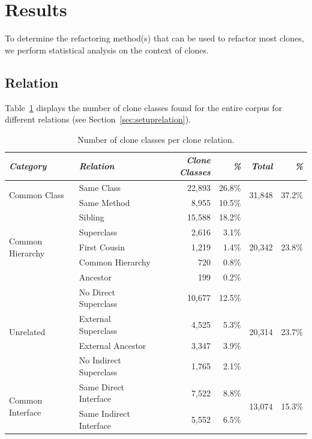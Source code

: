 \documentclass[runningheads]{llncs}
\begin{document}
\section{Results}
To determine the refactoring method(s) that can be used to refactor most clones, we perform statistical analysis on the context of clones.

\subsection{Relation} \label{sec:relationresults}
Table~\ref{tab:relation} displays the number of clone classes found for the entire corpus for different relations (see Section~\ref{sec:setuprelation}).

\begin{table}[H]
\centering
\begin{tabular}{@{}llrrrr@{}}
\toprule
\textit{\textbf{Category}} & \textit{\textbf{Relation}} & \textit{\textbf{Clone Classes}} & \textit{\textbf{\%}} & \textit{\textbf{Total}} & \textit{\textbf{\%}} \\ \midrule
\multirow{2}{*}{Common Class} & Same Class & 22,893 & 26.8\% & \multirow{2}{*}{31,848} & \multirow{2}{*}{37.2\%} \\ \cmidrule(lr){2-4}
 & Same Method & 8,955 & 10.5\% & & \\ \midrule
\multirow{5}{*}{Common Hierarchy} & Sibling & 15,588 & 18.2\% & \multirow{5}{*}{20,342}& \multirow{5}{*}{23.8\%} \\ \cmidrule(lr){2-4}
 & Superclass & 2,616 & 3.1\% & & \\ \cmidrule(lr){2-4}
 & First Cousin & 1,219 & 1.4\% & & \\ \cmidrule(lr){2-4}
 & Common Hierarchy & 720 & 0.8\% & & \\ \cmidrule(lr){2-4}
 & Ancestor & 199 & 0.2\% & & \\ \midrule
\multirow{4}{*}{Unrelated} & No Direct Superclass & 10,677 & 12.5\% & \multirow{4}{*}{20,314}& \multirow{4}{*}{23.7\%} \\ \cmidrule(lr){2-4}
 & External Superclass & 4,525 & 5.3\% & & \\ \cmidrule(lr){2-4}
 & External Ancestor & 3,347 & 3.9\% & & \\ \cmidrule(lr){2-4}
 & No Indirect Superclass & 1,765 & 2.1\% & & \\ \midrule
\multirow{2}{*}{Common Interface} & Same Direct Interface & 7,522 & 8.8\% & \multirow{2}{*}{13,074} & \multirow{2}{*}{15.3\%} \\ \cmidrule(lr){2-4}
 & Same Indirect Interface & 5,552 & 6.5\% & & \\ \bottomrule
\end{tabular}
\caption{Number of clone classes per clone relation.}
\label{tab:relation}
\end{table}
\end{document}
